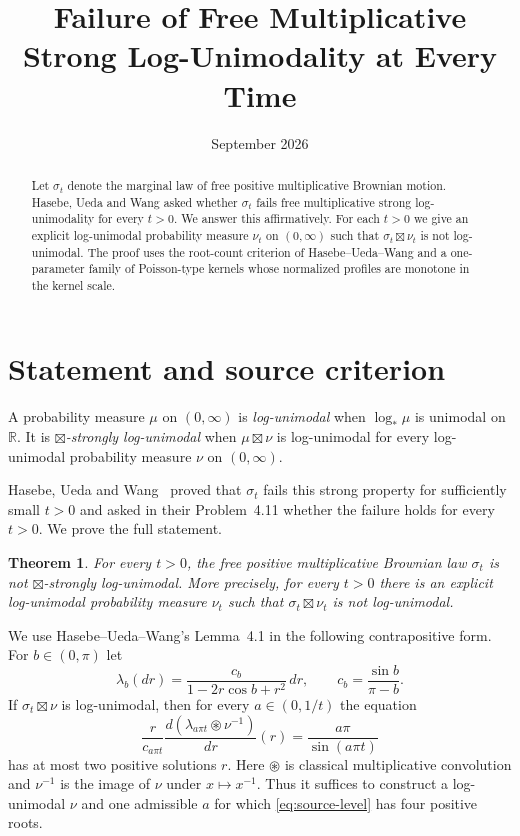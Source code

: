 \documentclass[11pt]{article}
\title{Failure of Free Multiplicative Strong Log-Unimodality at Every Time}
\author{}
\date{September 2026}
\newtheorem{theorem}{Theorem}
\newcommand{\R}{\mathbb R}
\begin{document}
\maketitle

\begin{abstract}
Let $\sigma_t$ denote the marginal law of free positive multiplicative Brownian motion. Hasebe, Ueda and Wang asked whether $\sigma_t$ fails free multiplicative strong log-unimodality for every $t>0$. We answer this affirmatively. For each $t>0$ we give an explicit log-unimodal probability measure $\nu_t$ on $(0,\infty)$ such that $\sigma_t\boxtimes\nu_t$ is not log-unimodal. The proof uses the root-count criterion of Hasebe--Ueda--Wang and a one-parameter family of Poisson-type kernels whose normalized profiles are monotone in the kernel scale.
\end{abstract}

\section{Statement and source criterion}

A probability measure $\mu$ on $(0,\infty)$ is \emph{log-unimodal} when $\log_*\mu$ is unimodal on $\R$. It is \emph{$\boxtimes$-strongly log-unimodal} when $\mu\boxtimes\nu$ is log-unimodal for every log-unimodal probability measure $\nu$ on $(0,\infty)$.

Hasebe, Ueda and Wang~\cite{HUW} proved that $\sigma_t$ fails this strong property for sufficiently small $t>0$ and asked in their Problem~4.11 whether the failure holds for every $t>0$. We prove the full statement.

\begin{theorem}\label{thm:main}
For every $t>0$, the free positive multiplicative Brownian law $\sigma_t$ is not $\boxtimes$-strongly log-unimodal. More precisely, for every $t>0$ there is an explicit log-unimodal probability measure $\nu_t$ such that $\sigma_t\boxtimes\nu_t$ is not log-unimodal.
\end{theorem}

We use Hasebe--Ueda--Wang's Lemma~4.1 in the following contrapositive form. For $b\in(0,\pi)$ let
\begin{equation}\label{eq:lambda}
 \lambda_b(dr)=\frac{c_b}{1-2r\cos b+r^2}\,dr,
 \qquad c_b=\frac{\sin b}{\pi-b}.
\end{equation}
If $\sigma_t\boxtimes\nu$ is log-unimodal, then for every $a\in(0,1/t)$ the equation
\begin{equation}\label{eq:source-level}
 \frac{r}{c_{a\pi t}}\frac{d(\lambda_{a\pi t}\circledast\nu^{-1})}{dr}(r)
 =\frac{a\pi}{\sin(a\pi t)}
\end{equation}
has at most two positive solutions $r$. Here $\circledast$ is classical multiplicative convolution and $\nu^{-1}$ is the image of $\nu$ under $x\mapsto x^{-1}$. Thus it suffices to construct a log-unimodal $\nu$ and one admissible $a$ for which \eqref{eq:source-level} has four positive roots.
\end{document}

